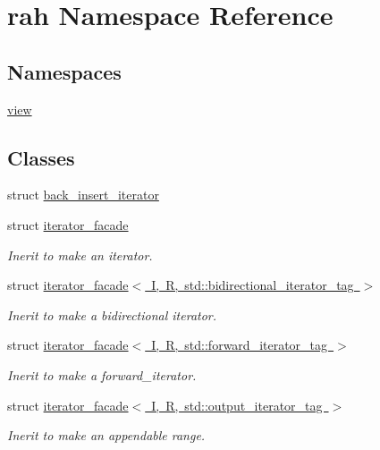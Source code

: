 \hypertarget{namespacerah}{}\section{rah Namespace Reference}
\label{namespacerah}
\subsection*{Namespaces}
\begin{DoxyCompactItemize}
\item 
 \mbox{\hyperlink{namespacerah_1_1view}{view}}
\end{DoxyCompactItemize}
\subsection*{Classes}
\begin{DoxyCompactItemize}
\item 
struct \mbox{\hyperlink{structrah_1_1back__insert__iterator}{back\+\_\+insert\+\_\+iterator}}
\item 
struct \mbox{\hyperlink{structrah_1_1iterator__facade}{iterator\+\_\+facade}}
\begin{DoxyCompactList}\small\item\em Inerit to make an iterator. \end{DoxyCompactList}\item 
struct \mbox{\hyperlink{structrah_1_1iterator__facade_3_01_i_00_01_r_00_01std_1_1bidirectional__iterator__tag_01_4}{iterator\+\_\+facade$<$ I, R, std\+::bidirectional\+\_\+iterator\+\_\+tag $>$}}
\begin{DoxyCompactList}\small\item\em Inerit to make a bidirectional iterator. \end{DoxyCompactList}\item 
struct \mbox{\hyperlink{structrah_1_1iterator__facade_3_01_i_00_01_r_00_01std_1_1forward__iterator__tag_01_4}{iterator\+\_\+facade$<$ I, R, std\+::forward\+\_\+iterator\+\_\+tag $>$}}
\begin{DoxyCompactList}\small\item\em Inerit to make a forward\+\_\+iterator. \end{DoxyCompactList}\item 
struct \mbox{\hyperlink{structrah_1_1iterator__facade_3_01_i_00_01_r_00_01std_1_1output__iterator__tag_01_4}{iterator\+\_\+facade$<$ I, R, std\+::output\+\_\+iterator\+\_\+tag $>$}}
\begin{DoxyCompactList}\small\item\em Inerit to make an appendable range. \end{DoxyCompactList}\item 

\end{DoxyCompactItemize}
